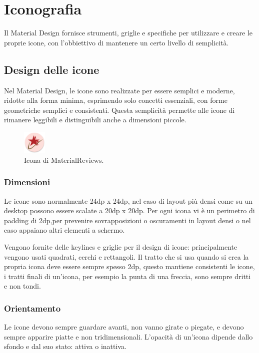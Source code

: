 \documentclass[12pt, a4paper]{report}
\begin{document}
	\section{Iconografia}
		Il Material Design fornisce strumenti, griglie e specifiche per utilizzare e creare le proprie icone, con l'obbiettivo di mantenere un certo livello di semplicità.
		\subsection{Design delle icone}
			Nel Material Design, le icone sono realizzate per essere semplici e moderne, ridotte alla forma minima, esprimendo solo concetti essenziali, con forme geometriche semplici e consistenti. Questa semplicità permette alle icone di rimanere leggibili e distinguibili anche a dimensioni piccole.
		\begin{figure}[h]
			\centering
			\includegraphics[width=0.1\textwidth]{ic_launcher_round} %
			\caption{Icona di MaterialReviews.}
		\end{figure}
			\subsubsection{Dimensioni}
			Le icone sono normalmente 24dp x 24dp, nel caso di layout più densi come su un desktop possono essere scalate a 20dp x 20dp.
			Per ogni icona vi è un perimetro di padding di 2dp,per prevenire sovrapposizioni o oscuramenti in layout densi o nel caso appaiano altri elementi a schermo.

			Vengono fornite delle keylines e griglie per il design di icone: principalmente vengono usati quadrati, cerchi e rettangoli.
			Il tratto che si usa quando si crea la propria icona deve essere sempre spesso 2dp, questo mantiene consistenti le icone, i tratti finali di un'icona, per esempio la punta di una freccia, sono sempre dritti e non tondi.

			\subsubsection{Orientamento}
			Le icone devono sempre guardare avanti, non vanno girate o piegate, e devono sempre apparire piatte e non tridimensionali.
			L'opacità di un'icona dipende dallo sfondo e dal suo stato: attiva o inattiva.
\end{document}

